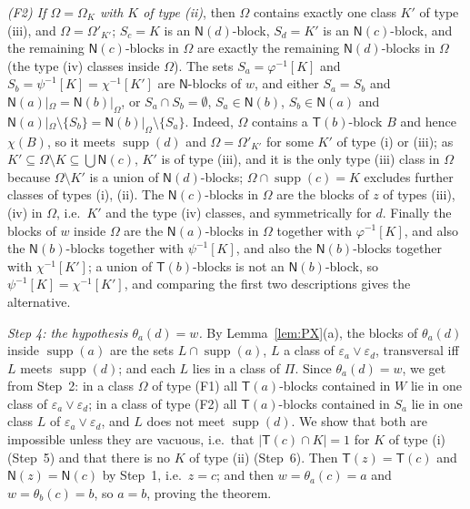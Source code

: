 \documentclass[11pt]{amsart}
\theoremstyle{definition}
\newcommand{\supp}{\operatorname{supp}}
\newcommand{\T}{\mathsf{T}}
\newcommand{\N}{\mathsf{N}}
\begin{document}
\emph{(F2) If $\Omega=\Omega_K$ with $K$ of type \textup{(ii)}}, then $\Omega$ contains exactly one class $K'$ of type (iii), and $\Omega=\Omega'_{K'}$; $S_c=K$ is an $\N(d)$-block, $S_d=K'$ is an $\N(c)$-block, and the remaining $\N(c)$-blocks in $\Omega$ are exactly the remaining $\N(d)$-blocks in $\Omega$ (the type (iv) classes inside $\Omega$). The sets $S_a=\varphi^{-1}[K]$ and $S_b=\psi^{-1}[K]=\chi^{-1}[K']$ are $\N$-blocks of $w$, and either $S_a=S_b$ and $\N(a)|_\Omega=\N(b)|_\Omega$, or $S_a\cap S_b=\emptyset$, $S_a\in\N(b)$, $S_b\in\N(a)$ and $\N(a)|_\Omega\setminus\{S_b\}=\N(b)|_\Omega\setminus\{S_a\}$. Indeed, $\Omega$ contains a $\T(b)$-block $B$ and hence $\chi(B)$, so it meets $\supp(d)$ and $\Omega=\Omega'_{K'}$ for some $K'$ of type (i) or (iii); as $K'\subseteq\Omega\setminus K\subseteq\bigcup\N(c)$, $K'$ is of type (iii), and it is the only type (iii) class in $\Omega$ because $\Omega\setminus K'$ is a union of $\N(d)$-blocks; $\Omega\cap\supp(c)=K$ excludes further classes of types (i), (ii). The $\N(c)$-blocks in $\Omega$ are the blocks of $z$ of types (iii), (iv) in $\Omega$, i.e.\ $K'$ and the type (iv) classes, and symmetrically for $d$. Finally the blocks of $w$ inside $\Omega$ are the $\N(a)$-blocks in $\Omega$ together with $\varphi^{-1}[K]$, and also the $\N(b)$-blocks together with $\psi^{-1}[K]$, and also the $\N(b)$-blocks together with $\chi^{-1}[K']$; a union of $\T(b)$-blocks is not an $\N(b)$-block, so $\psi^{-1}[K]=\chi^{-1}[K']$, and comparing the first two descriptions gives the alternative.

\smallskip
\emph{Step 4: the hypothesis $\theta_a(d)=w$.} By Lemma~\ref{lem:PX}(a), the blocks of $\theta_a(d)$ inside $\supp(a)$ are the sets $L\cap\supp(a)$, $L$ a class of $\varepsilon_a\vee\varepsilon_d$, transversal iff $L$ meets $\supp(d)$; and each $L$ lies in a class of $\Pi$. Since $\theta_a(d)=w$, we get from Step~2: in a class $\Omega$ of type (F1) all $\T(a)$-blocks contained in $W$ lie in one class of $\varepsilon_a\vee\varepsilon_d$; in a class of type (F2) all $\T(a)$-blocks contained in $S_a$ lie in one class $L$ of $\varepsilon_a\vee\varepsilon_d$, and $L$ does not meet $\supp(d)$. We show that both are impossible unless they are vacuous, i.e.\ that $|\T(c)\cap K|=1$ for $K$ of type (i) (Step~5) and that there is no $K$ of type (ii) (Step~6). Then $\T(z)=\T(c)$ and $\N(z)=\N(c)$ by Step~1, i.e.\ $z=c$; and then $w=\theta_a(c)=a$ and $w=\theta_b(c)=b$, so $a=b$, proving the theorem.
\end{document}
